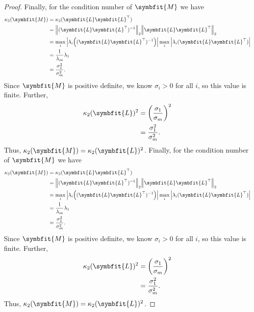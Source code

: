 \documentclass{article}
\theoremstyle{definition}
\newcommand{\mat}[1]{\symbfit{#1}}
\begin{document}
\begin{enumerate}[leftmargin=\labelsep]
\begin{proof}
		      Finally, for the condition number of \(\mat{M}\) we have
		      \begin{align*}
			      \kappa_2(\mat{M}) & = \kappa_2(\mat{L}\mat{L}^\top)                                                                          \\
			                        & = \norm{(\mat{L}\mat{L}^\top)^{-1}}_2 \norm{\mat{L}\mat{L}^\top}_2                                       \\
			                        & = \max_i \abs{ \lambda_i\qty((\mat{L}\mat{L}^\top)^{-1} )} \max_i \abs{ \lambda_i(\mat{L}\mat{L}^\top) } \\
			                        & = \frac{1}{\lambda_m} \lambda_1                                                                          \\
			                        & = \frac{\sigma_1^2}{\sigma_m^2}.
		      \end{align*}
		      Since \(\mat{M}\) is positive definite, we know \(\sigma_i>0\) for all \(i\), so this value is finite. Further,
		      \begin{align*}
			      \kappa_2(\mat{L})^2 & = \qty(\frac{\sigma_1}{\sigma_m})^2 \\
			                          & = \frac{\sigma_1^2}{\sigma_m^2}.
		      \end{align*}
		      Thus, \(\kappa_2(\mat{M}) = \kappa_2(\mat{L})^2\).
		      Finally, for the condition number of \(\mat{M}\) we have
		      \begin{align*}
			      \kappa_2(\mat{M}) & = \kappa_2(\mat{L}\mat{L}^\top)                                                                          \\
			                        & = \norm{(\mat{L}\mat{L}^\top)^{-1}}_2 \norm{\mat{L}\mat{L}^\top}_2                                       \\
			                        & = \max_i \abs{ \lambda_i\qty((\mat{L}\mat{L}^\top)^{-1} )} \max_i \abs{ \lambda_i(\mat{L}\mat{L}^\top) } \\
			                        & = \frac{1}{\lambda_m} \lambda_1                                                                          \\
			                        & = \frac{\sigma_1^2}{\sigma_m^2}.
		      \end{align*}
		      Since \(\mat{M}\) is positive definite, we know \(\sigma_i>0\) for all \(i\), so this value is finite. Further,
		      \begin{align*}
			      \kappa_2(\mat{L})^2 & = \qty(\frac{\sigma_1}{\sigma_m})^2 \\
			                          & = \frac{\sigma_1^2}{\sigma_m^2}.
		      \end{align*}
		      Thus, \(\kappa_2(\mat{M}) = \kappa_2(\mat{L})^2\).
	      \end{proof}


\end{enumerate}
\end{document}
